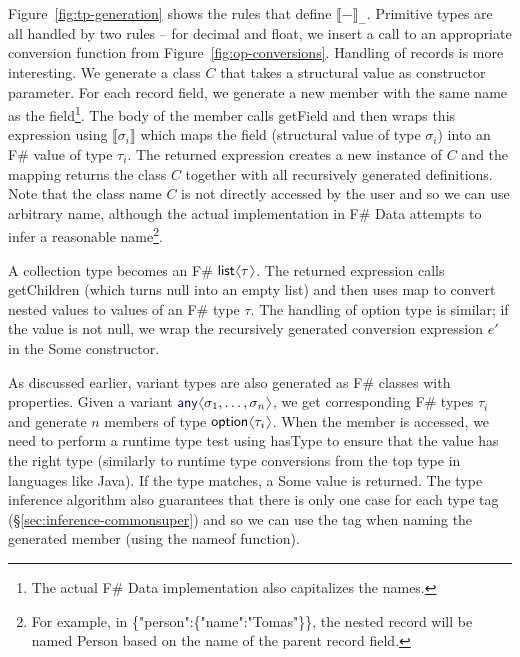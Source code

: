 \documentclass[10pt,preprint,blind,clearpagebib]{sigplanconf}
\newcommand{\langl}{\begin{picture}(4.5,7)
\put(1.1,2.5){\rotatebox{60}{\line(1,0){5.5}}}
\put(1.1,2.5){\rotatebox{300}{\line(1,0){5.5}}}
\end{picture}}
\newcommand{\rangl}{\begin{picture}(4.5,7)
\put(.9,2.5){\rotatebox{120}{\line(1,0){5.5}}}
\put(.9,2.5){\rotatebox{240}{\line(1,0){5.5}}}
\end{picture}}
\newcommand{\kvd}[1]{\textnormal{\textcolor{kvdclr}{\sffamily #1}}}
\newcommand{\str}[1]{\textnormal{\textcolor{strclr}{\sffamily "#1"}}}
\newcommand{\ident}[1]{\textnormal{\sffamily #1}}
\newcommand{\sem}[1]{\llbracket #1 \rrbracket}
\begin{document}
Figure~\ref{fig:tp-generation} shows the rules that define $\sem{-}_{-}$. Primitive types are all
handled by two rules -- for \ident{decimal} and \ident{float}, we insert a call to an appropriate 
conversion function from Figure~\ref{fig:op-conversions}.
Handling of records is more interesting. We generate a class $C$ that takes a structural value as constructor
parameter. For each record field, we generate a new member with the same name as the field\footnote{The actual
F\# Data implementation also capitalizes the names.}. The body of the member calls \ident{getField} and then
wraps this expression using $\sem{\sigma_i}$ which maps the field (structural value of type $\sigma_i$) into 
an F\# value of type $\tau_i$. The returned expression creates a new instance of $C$ and the mapping returns 
the class $C$ together with all recursively generated definitions. Note that the class
name $C$ is not directly accessed by the user and so we can use arbitrary name, although the actual 
implementation in F\# Data attempts to infer a reasonable name\footnote{For example, in 
\ident{\{\str{person}:\{\str{name}:\str{Tomas}\}\}}, the nested record will be named \ident{Person}
based on the name of the parent record field.}.

A collection type becomes an F\# $\ident{list}\langl\tau\rangl$. The returned expression calls \ident{getChildren}
(which turns \kvd{null} into an empty list) and then uses \ident{map} to convert nested values to 
values of an F\# type $\tau$. The handling of option type is similar; if the value is not \kvd{null},
we wrap the recursively generated conversion expression $e'$ in the \ident{Some} constructor.

As discussed earlier, variant types are also generated as F\# classes with properties. Given a variant
$\kvd{any}\langl\sigma_1, \ldots, \sigma_n\rangl$, we get corresponding F\# types $\tau_i$ and generate 
$n$ members of type $\ident{option}\langl \tau_i\rangl$. When the member is accessed, we need to perform
a runtime type test using \ident{hasType} to ensure that the value has the right type (similarly to runtime 
type conversions from the top type in languages like Java). If the type matches, a \ident{Some} value is 
returned. The type inference algorithm also guarantees that there is only one case for each type tag 
(\S\ref{sec:inference-commonsuper}) and so we can use the tag when naming the generated member 
(using the \ident{nameof} function).
\end{document}
